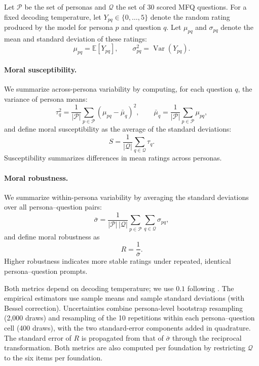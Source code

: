 Let $\mathcal{P}$ be the set of personas and $\mathcal{Q}$ the set of 30 scored MFQ questions. For a fixed decoding temperature, let $Y_{pq} \in \{0,\ldots,5\}$ denote the random rating produced by the model for persona $p$ and question $q$. Let $\mu_{pq}$ and $\sigma_{pq}$ denote the mean and standard deviation of these ratings:
\begin{equation}
  \mu_{pq} = \mathbb{E}[Y_{pq}], \qquad \sigma_{pq}^2 = \operatorname{Var}(Y_{pq}).
  \label{eq:persona-question-mean}
\end{equation}

\paragraph{Moral susceptibility.} We summarize across-persona variability by computing, for each question $q$, the variance of persona means:
\begin{equation}
  \tau_q^2 = \frac{1}{|\mathcal{P}|} \sum_{p \in \mathcal{P}} (\mu_{pq} - \bar{\mu}_q)^2, \qquad
  \bar{\mu}_q = \frac{1}{|\mathcal{P}|} \sum_{p \in \mathcal{P}} \mu_{pq},
  \label{eq:question-dispersion}
\end{equation}
and define moral susceptibility as the average of the standard deviations:
\begin{equation}
  S = \frac{1}{|\mathcal{Q}|} \sum_{q \in \mathcal{Q}} \tau_q.
  \label{eq:susceptibility}
\end{equation}
Susceptibility summarizes differences in mean ratings across personas.

\paragraph{Moral robustness.} We summarize within-persona variability by averaging the standard deviations over all persona--question pairs:
\begin{equation}
  \bar{\sigma} = \frac{1}{|\mathcal{P}|\,|\mathcal{Q}|} \sum_{p \in \mathcal{P}} \sum_{q \in \mathcal{Q}} \sigma_{pq},
  \label{eq:mean-sigma}
\end{equation}
and define moral robustness as
\begin{equation}
  R = \frac{1}{\bar{\sigma}}.
  \label{eq:robustness}
\end{equation}
Higher robustness indicates more stable ratings under repeated, identical persona--question prompts.

Both metrics depend on decoding temperature; we use $0.1$ following \cite{costa2025moral}. The empirical estimators use sample means and sample standard deviations (with Bessel correction). Uncertainties combine persona-level bootstrap resampling (2,000 draws) and resampling of the 10 repetitions within each persona--question cell (400 draws), with the two standard-error components added in quadrature. The standard error of $R$ is propagated from that of $\bar{\sigma}$ through the reciprocal transformation. Both metrics are also computed per foundation by restricting $\mathcal{Q}$ to the six items per foundation.

